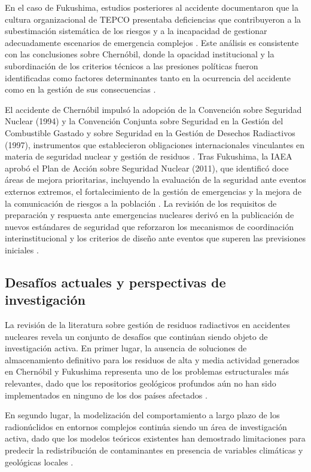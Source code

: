 En el caso de Fukushima, estudios posteriores al accidente documentaron que la
cultura organizacional de TEPCO presentaba deficiencias que contribuyeron a la
subestimación sistemática de los riesgos y a la incapacidad de gestionar
adecuadamente escenarios de emergencia complejos \cite{Suzuki2014}. Este análisis
es consistente con las conclusiones sobre Chernóbil, donde la opacidad
institucional y la subordinación de los criterios técnicos a las presiones
políticas fueron identificadas como factores determinantes tanto en la ocurrencia
del accidente como en la gestión de sus consecuencias \cite{Shlyakhter, Wakeford}.

El accidente de Chernóbil impulsó la adopción de la Convención sobre Seguridad
Nuclear (1994) y la Convención Conjunta sobre Seguridad en la Gestión del
Combustible Gastado y sobre Seguridad en la Gestión de Desechos Radiactivos (1997),
instrumentos que establecieron obligaciones internacionales vinculantes en materia
de seguridad nuclear y gestión de residuos \cite{IAEAJointConvention}. Tras
Fukushima, la IAEA aprobó el Plan de Acción sobre Seguridad Nuclear (2011), que
identificó doce áreas de mejora prioritarias, incluyendo la evaluación de la
seguridad ante eventos externos extremos, el fortalecimiento de la gestión de
emergencias y la mejora de la comunicación de riesgos a la población
\cite{IAEAActionPlan2011}. La revisión de los requisitos de preparación y respuesta
ante emergencias nucleares derivó en la publicación de nuevos estándares de
seguridad que reforzaron los mecanismos de coordinación interinstitucional y los
criterios de diseño ante eventos que superen las previsiones iniciales
\cite{IAEAGSG152022}.

\subsection{Desafíos actuales y perspectivas de investigación}

La revisión de la literatura sobre gestión de residuos radiactivos en accidentes
nucleares revela un conjunto de desafíos que continúan siendo objeto de
investigación activa. En primer lugar, la ausencia de soluciones de almacenamiento
definitivo para los residuos de alta y media actividad generados en Chernóbil y
Fukushima representa uno de los problemas estructurales más relevantes, dado que
los repositorios geológicos profundos aún no han sido implementados en ninguno de
los dos países afectados \cite{IAEAWSR62021}.

En segundo lugar, la modelización del comportamiento a largo plazo de los
radionúclidos en entornos complejos continúa siendo un área de investigación
activa, dado que los modelos teóricos existentes han demostrado limitaciones para
predecir la redistribución de contaminantes en presencia de variables climáticas
y geológicas locales \cite{Saito, Konoplev}.

